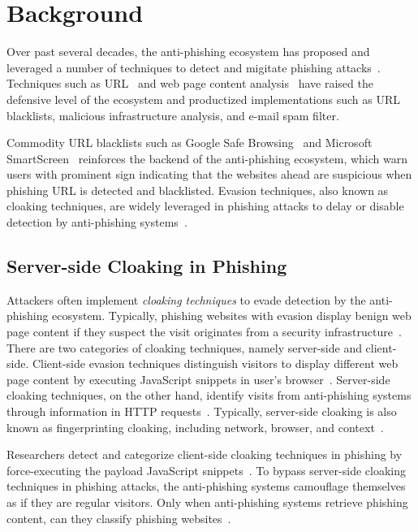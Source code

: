 \section{Background}

Over past several decades, the anti-phishing ecosystem has proposed and leveraged a number of techniques to detect and migitate phishing attacks~\cite{oest2018inside}.
Techniques such as URL~\cite{bin2010dns, blum2010lexical, huang2012svm, khonji2011novel} and web page content analysis~\cite{wu2006web, zhang2007cantina, zhang2011textual, bilge2011exposure, canali2013role} have raised the defensive level of the ecosystem and productized implementations such as URL blacklists, malicious infrastructure analysis, and e-mail spam filter.

Commodity URL blacklists such as Google Safe Browsing~\cite{whittaker2010large} and Microsoft SmartScreen~\cite{smartscreen} reinforces the backend of the anti-phishing ecosystem, which warn users with prominent sign indicating that the websites ahead are suspicious when phishing URL is detected and blacklisted.
Evasion techniques, also known as cloaking techniques, are widely leveraged in phishing attacks to delay or disable detection by anti-phishing systems~\cite{liang2016cracking, oest2019phishfarm, oest20phishtime}.

\subsection{Server-side Cloaking in Phishing}

Attackers often implement \emph{cloaking techniques} to evade detection by the anti-phishing ecosystem.
Typically, phishing websites with evasion display benign web page content if they suspect the visit originates from a security infrastructure~\cite{wu2005cloaking}.
There are two categories of cloaking techniques, namely server-side and client-side.
Client-side evasion techniques distinguish visitors to display different web page content by executing JavaScript snippets in user's browser~\cite{zhang2021crawlphish}.
Server-side cloaking techniques, on the other hand, identify visits from anti-phishing systems through information in HTTP requests~\cite{oest2018inside, invernizzi2016cloak}.
Typically, server-side cloaking is also known as fingerprinting cloaking, including network, browser, and context~\cite{invernizzi2016cloak}.

Researchers detect and categorize client-side cloaking techniques in phishing by force-executing the payload JavaScript snippets~\cite{zhang2021crawlphish}.
To bypass server-side cloaking techniques in phishing attacks, the anti-phishing systems camouflage themselves as if they are regular visitors.
Only when anti-phishing systems retrieve phishing content, can they classify phishing websites~\cite{xiang2011cantina+,whittaker2010large,smartscreen}.

